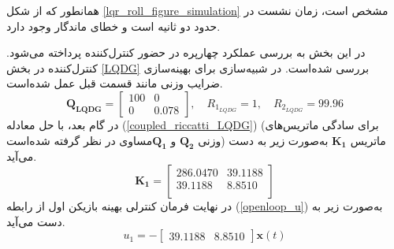 \documentclass{CCI2020}
\begin{document}
 همانطور که از شکل
	\ref{lqr_roll_figure_simulation}
	مشخص است، زمان نشست در حدود دو ثانیه است و خطای ماندگار وجود دارد.
	
	
	
	
	
	
	
	در این بخش به بررسی عملکرد چهارپره در حضور کنترل‌کننده  پرداخته می‌شود. کنترل‌کننده  در بخش
	\ref{LQDG}
	بررسی شده‌است.
	در شبیه‌سازی برای بهینه‌سازی ضرایب وزنی مانند قسمت قبل عمل شده‌است.
	\begin{equation}
		\boldsymbol{Q_{LQDG}} = \begin{bmatrix}
			100 & 0\\
			0 & 0.078
		\end{bmatrix}, \quad R_{1_{LQDG}} =  1, \quad R_{2_{LQDG}} =  99.96
	\end{equation}
	در گام بعد، با حل معادله
	(\ref{coupled_riccatti_LQDG})
	(برای سادگی ماتریس‌های وزنی $\boldsymbol{{Q}_{2}}$ و $\boldsymbol{{Q}_{1}}$مساوی در نظر گرفته شده‌است)
	ماتریس
	$\boldsymbol{{K}_1}$
	به‌صورت زیر به دست می‌آید.
	\begin{equation}
		\boldsymbol{K_1} = \begin{bmatrix}
			
			286.0470  & 39.1188\\
			39.1188   & 8.8510\\
		\end{bmatrix}
	\end{equation}
	در نهایت فرمان کنترلی بهینه بازیکن اول از رابطه
	(\ref{openloop_u})
	به‌صورت زیر به دست می‌آید.
	\begin{equation}
		u_1 = -\begin{bmatrix}
			39.1188   & 8.8510
		\end{bmatrix}\boldsymbol{x}(t)
	\end{equation}
	
\end{document}

